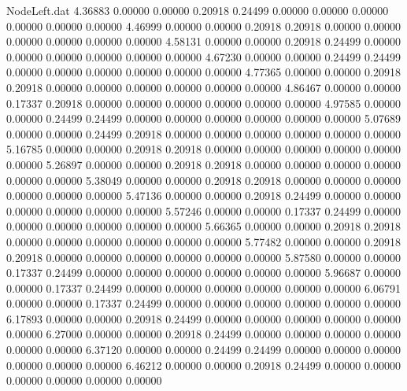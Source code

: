 \begin{filecontents}{NodeLeft.dat}
   4.36883    0.00000    0.00000     0.20918    0.24499    0.00000    0.00000    0.00000    0.00000    0.00000    0.00000
   4.46999    0.00000    0.00000     0.20918    0.20918    0.00000    0.00000    0.00000    0.00000    0.00000    0.00000
   4.58131    0.00000    0.00000     0.20918    0.24499    0.00000    0.00000    0.00000    0.00000    0.00000    0.00000
   4.67230    0.00000    0.00000     0.24499    0.24499    0.00000    0.00000    0.00000    0.00000    0.00000    0.00000
   4.77365    0.00000    0.00000     0.20918    0.20918    0.00000    0.00000    0.00000    0.00000    0.00000    0.00000
   4.86467    0.00000    0.00000     0.17337    0.20918    0.00000    0.00000    0.00000    0.00000    0.00000    0.00000
   4.97585    0.00000    0.00000     0.24499    0.24499    0.00000    0.00000    0.00000    0.00000    0.00000    0.00000
   5.07689    0.00000    0.00000     0.24499    0.20918    0.00000    0.00000    0.00000    0.00000    0.00000    0.00000
   5.16785    0.00000    0.00000     0.20918    0.20918    0.00000    0.00000    0.00000    0.00000    0.00000    0.00000
   5.26897    0.00000    0.00000     0.20918    0.20918    0.00000    0.00000    0.00000    0.00000    0.00000    0.00000
   5.38049    0.00000    0.00000     0.20918    0.20918    0.00000    0.00000    0.00000    0.00000    0.00000    0.00000
   5.47136    0.00000    0.00000     0.20918    0.24499    0.00000    0.00000    0.00000    0.00000    0.00000    0.00000
   5.57246    0.00000    0.00000     0.17337    0.24499    0.00000    0.00000    0.00000    0.00000    0.00000    0.00000
   5.66365    0.00000    0.00000     0.20918    0.20918    0.00000    0.00000    0.00000    0.00000    0.00000    0.00000
   5.77482    0.00000    0.00000     0.20918    0.20918    0.00000    0.00000    0.00000    0.00000    0.00000    0.00000
   5.87580    0.00000    0.00000     0.17337    0.24499    0.00000    0.00000    0.00000    0.00000    0.00000    0.00000
   5.96687    0.00000    0.00000     0.17337    0.24499    0.00000    0.00000    0.00000    0.00000    0.00000    0.00000
   6.06791    0.00000    0.00000     0.17337    0.24499    0.00000    0.00000    0.00000    0.00000    0.00000    0.00000
   6.17893    0.00000    0.00000     0.20918    0.24499    0.00000    0.00000    0.00000    0.00000    0.00000    0.00000
   6.27000    0.00000    0.00000     0.20918    0.24499    0.00000    0.00000    0.00000    0.00000    0.00000    0.00000
   6.37120    0.00000    0.00000     0.24499    0.24499    0.00000    0.00000    0.00000    0.00000    0.00000    0.00000
   6.46212    0.00000    0.00000     0.20918    0.24499    0.00000    0.00000    0.00000    0.00000    0.00000    0.00000

\end{filecontents}
